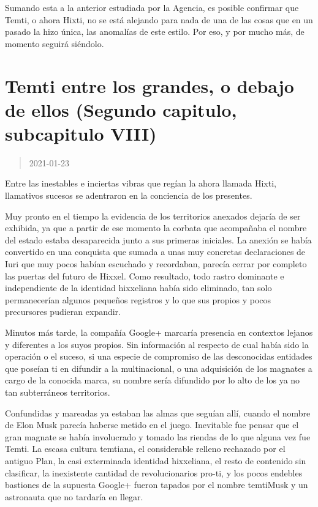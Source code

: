 \documentclass[
  spanish,
]{book}
\begin{document}
Sumando esta a la anterior estudiada por la Agencia, es posible confirmar que Temti, o ahora Hixti, no se está alejando para nada de una de las cosas que en un pasado la hizo única, las anomalías de este estilo. Por eso, y por mucho más, de momento seguirá siéndolo.

\hypertarget{temti-entre-los-grandes-o-debajo-de-ellos-segundo-capitulo-subcapitulo-viii}{%
\section{Temti entre los grandes, o debajo de ellos (Segundo capitulo, subcapitulo VIII)}\label{temti-entre-los-grandes-o-debajo-de-ellos-segundo-capitulo-subcapitulo-viii}}

\begin{quote}
2021-01-23
\end{quote}

Entre las inestables e inciertas vibras que regían la ahora llamada Hixti, llamativos sucesos se adentraron en la conciencia de los presentes.

Muy pronto en el tiempo la evidencia de los territorios anexados dejaría de ser exhibida, ya que a partir de ese momento la corbata que acompañaba el nombre del estado estaba desaparecida junto a sus primeras iniciales. La anexión se había convertido en una conquista que sumada a unas muy concretas declaraciones de Iuri que muy pocos habían escuchado y recordaban, parecía cerrar por completo las puertas del futuro de Hixxel. Como resultado, todo rastro dominante e independiente de la identidad hixxeliana había sido eliminado, tan solo permanecerían algunos pequeños registros y lo que sus propios y pocos precursores pudieran expandir.

Minutos más tarde, la compañía Google+ marcaría presencia en contextos lejanos y diferentes a los suyos propios. Sin información al respecto de cual había sido la operación o el suceso, si una especie de compromiso de las desconocidas entidades que poseían ti en difundir a la multinacional, o una adquisición de los magnates a cargo de la conocida marca, su nombre sería difundido por lo alto de los ya no tan subterráneos territorios.

Confundidas y mareadas ya estaban las almas que seguían allí, cuando el nombre de Elon Musk parecía haberse metido en el juego. Inevitable fue pensar que el gran magnate se había involucrado y tomado las riendas de lo que alguna vez fue Temti.
La escasa cultura temtiana, el considerable relleno rechazado por el antiguo Plan, la casi exterminada identidad hixxeliana, el resto de contenido sin clasificar, la inexistente cantidad de revolucionarios pro-ti, y los pocos endebles bastiones de la supuesta Google+ fueron tapados por el nombre temtiMusk y un astronauta que no tardaría en llegar.
\end{document}
